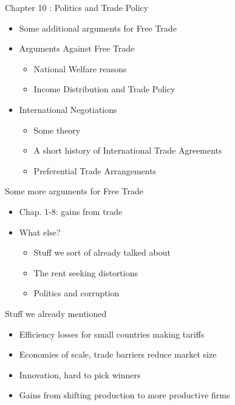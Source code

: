 \documentclass{beamer}
\begin{document}
\begin{frame}{Chapter 10 : Politics and Trade Policy}

    \begin{itemize}
        \item Some additional arguments for Free Trade
        \item Arguments Against Free Trade
        \begin{itemize}
            \item National Welfare reasons 
            \item Income Distribution and Trade Policy
        \end{itemize}
        \item International Negotiations
        \begin{itemize}
            \item Some theory
            \item A short history of International Trade Agreements 
            \item Preferential Trade Arrangements
        \end{itemize}
    \end{itemize}

\end{frame}

\begin{frame}{Some more arguments for Free Trade}

\begin{itemize}
    \item Chap. 1-8: gains from trade
    \item What else?
    \begin{itemize}
        \item Stuff we sort of already talked about
        \item The rent seeking distortions
        \item Politics and corruption
    \end{itemize}
\end{itemize}

\end{frame}

\begin{frame}{Stuff we already mentioned}

    \begin{itemize}
        \item Efficiency losses for small countries making tariffs
        \item Economies of scale, trade barriers reduce market size 
        \item Innovation, hard to pick winners
        \item Gains from shifting production to more productive firms
    \end{itemize}

\end{frame}
\end{document}
